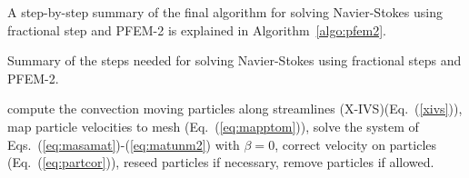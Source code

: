 A step-by-step summary of the final algorithm for solving Navier-Stokes using fractional step and PFEM-2 is explained in Algorithm~\ref{algo:pfem2}.
%
\begin{algorithm}[H]
\caption{Summary of the steps needed for solving Navier-Stokes using fractional steps and PFEM-2.}
\label{algo:pfem2}
\begin{algorithmic}[1]
\STATE compute the convection moving particles along streamlines (X-IVS)(Eq.~(\ref{xivs})),
\STATE map particle velocities to mesh (Eq.~(\ref{eq:mapptom})),
\STATE solve the system of Eqs.~(\ref{eq:masamat})-(\ref{eq:matunm2}) with $\beta=0$,
\STATE correct velocity on particles (Eq.~(\ref{eq:partcor})),
\STATE reseed particles if necessary,
\STATE remove particles if allowed.
\end{algorithmic}
\end{algorithm} 
%
